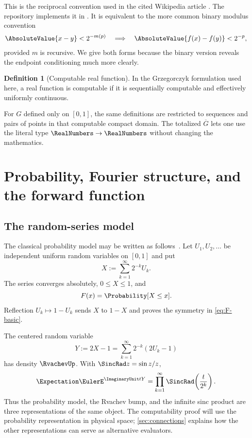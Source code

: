 \documentclass[11pt,oneside]{article}
\theoremstyle{definition}
\newtheorem{definition}[theorem]{Definition}
\theoremstyle{remark}
\numberwithin{equation}{section}
\newcommand{\InvT}{\overline G}
\begin{document}
This is the reciprocal convention used in the cited Wikipedia article
\cite{WikipediaCRF}.  The repository implements it in
.  It is equivalent to the more common binary
modulus convention
\begin{equation}\label{eq:binary-modulus-convention}
 \AbsoluteValue{x-y}<2^{-m(p)}
 \quad\Longrightarrow\quad
 \AbsoluteValue{f(x)-f(y)}<2^{-p},
\end{equation}
provided $m$ is recursive.  We give both forms because the binary version
reveals the endpoint conditioning much more clearly.

\begin{definition}[Computable real function]\label{def:computable-function}
In the Grzegorczyk formulation used here, a real function is computable if it
is sequentially computable and effectively uniformly continuous.
\end{definition}

For $G$ defined only on $[0,1]$, the same definitions are restricted to
sequences and pairs of points in that computable compact domain.  The totalized
$\InvT$ lets one use the literal type $\RealNumbers\to\RealNumbers$ without changing the
mathematics.

\section{Probability, Fourier structure, and the forward function}
\label{sec:forward}

\subsection{The random-series model}

The classical probability model may be written as follows\ \cite{Fabius1966,Arias05442,ProveIt}.  Let $U_1,U_2,\ldots$ be independent uniform random variables on $[0,1]$ and
put
\begin{equation}\label{eq:random-series}
 X:=\sum_{k=1}^{\infty}2^{-k}U_k.
\end{equation}
The series converges absolutely, $0\le X\le1$, and
\begin{equation}\label{eq:F-cdf}
 F(x)=\Probability[X\le x].
\end{equation}
Reflection $U_k\mapsto1-U_k$ sends $X$ to $1-X$ and proves the symmetry in
\eqref{eq:F-basic}.

The centered random variable
\begin{equation}\label{eq:centered-random}
 Y:=2X-1=\sum_{k=1}^{\infty}2^{-k}(2U_k-1)
\end{equation}
has density $\RvachevUp$.  With $\SincRad z=\sin z/z$,
\begin{equation}\label{eq:sinc-product}
 \Expectation\EulerE^{\ImaginaryUnit tY}
 =\prod_{k=1}^{\infty}\SincRad\!\left(\frac{t}{2^k}\right).
\end{equation}
Thus the probability model, the Rvachev bump, and the infinite sinc product
are three representations of the same object.  The computability proof will
use the probability representation in physical space; \cref{sec:connections}
explains how the other representations can serve as alternative evaluators.
\end{document}
